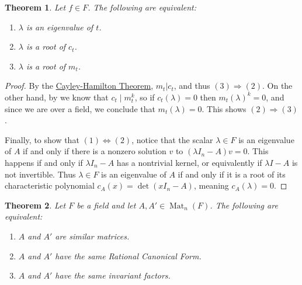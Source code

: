 \documentclass[12pt]{report}
\newtheorem{theorem}{Theorem}[chapter]
\newtheorem{lemma}[theorem]{Lemma}
\numberwithin{equation}{section}
\numberwithin{theorem}{chapter}
\theoremstyle{definition}
\newtheorem*{basic properties}{Basic Properties}
\newtheorem*{Important Remark}{Important Remark}
\DeclareMathOperator{\M}{Mat}
\DeclareMathOperator{\ann}{ann}
\begin{document}
\begin{theorem}\label{eigenvalues}
Let $f \in F$. The following are equivalent: 
\begin{enumerate}[label=(\arabic*)]
\item $\lambda$ is an eigenvalue of $t$. 
\item $\lambda$ is a root of $c_t$.
\item $\lambda$ is a root of $m_t$. 
\end{enumerate}
\end{theorem}


\begin{proof}
	By the \hyperref[cayley-hamilton]{Cayley-Hamilton Theorem}, $m_t|c_t$, and thus $(3) \Rightarrow (2)$. On the other hand, by  we know that $c_t  \mid m_t^k$, so if $c_t(\lambda) = 0$ then $m_t(\lambda)^k=0$, and since we are over a field, we conclude that $m_t(\lambda) = 0$. This shows $(2) \Rightarrow (3)$.
	
Finally, to show that $(1) \Leftrightarrow (2)$, notice that the scalar $\lambda\in F$ is an eigenvalue of $A$ if and only if there is a nonzero solution $v$ to $(\lambda I_n-A)v = 0$. This happens if and only if $\lambda I_n - A$ has a nontrivial kernel, or equivalently if $\lambda I - A$ is not invertible. Thus $\lambda\in F$ is an eigenvalue of $A$ if and only if it is a root of its characteristic polynomial $c_A(x)=\det(xI_n-A)$, meaning $c_A(\lambda)=0$.
\end{proof}

%
%
%
%




\begin{theorem}
Let $F$ be a field and let $A, A' \in \M_n(F)$. The following are equivalent:
\begin{enumerate}[leftmargin=17pt,label=(\arabic*)]
\item $A$ and $A'$ are similar matrices. 
\item $A$ and $A'$ have the same Rational Canonical Form. 
\item $A$ and $A'$ have the same invariant factors. 
\end{enumerate}
\end{theorem}
\end{document}
